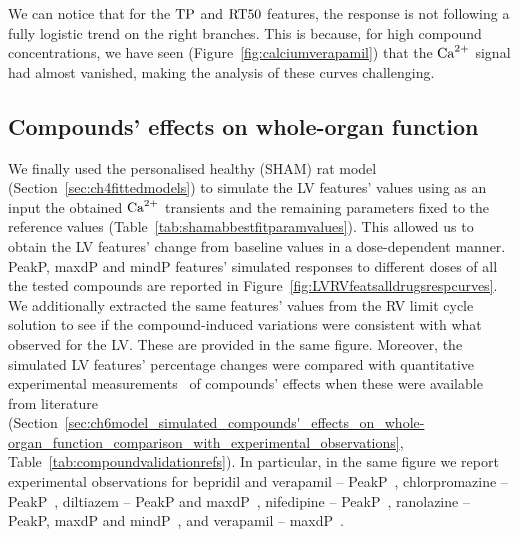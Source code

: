 \vspace{0.2cm}\noindent
We can notice that for the $\textrm{TP}$ and $\textrm{RT50}$ features, the response is not following a fully logistic trend on the right branches. This is because, for high compound concentrations, we have seen (Figure~\ref{fig:calciumverapamil}) that the $\textrm{Ca}^{2+}$ signal had almost vanished, making the analysis of these curves challenging.


%
%
%
\subsection{Compounds' effects on whole-organ function}\label{sec:ch6compounds_effects_on_the_whole_organ_function}
We finally used the personalised healthy (SHAM) rat model (Section~\ref{sec:ch4fittedmodels}) to simulate the LV features' values using as an input the obtained $\textrm{Ca}^{2+}$ transients and the remaining parameters fixed to the reference values (Table~\ref{tab:shamabbestfitparamvalues}). This allowed us to obtain the LV features' change from baseline values in a dose-dependent manner. PeakP, maxdP and mindP features' simulated responses to different doses of all the tested compounds are reported in Figure~\ref{fig:LVRVfeatsalldrugsrespcurves}. We additionally extracted the same features' values from the RV limit cycle solution to see if the compound-induced variations were consistent with what observed for the LV. These are provided in the same figure. Moreover, the simulated LV features' percentage changes were compared with quantitative experimental measurements~\cite{Amsterdam:1988,Langslet:1971,Koltai:1989,Saponara:2007,Wang:2007,Kolar:1990} of compounds' effects when these were available from literature (Section~\ref{sec:ch6model_simulated_compounds'_effects_on_whole-organ_function_comparison_with_experimental_observations}, Table~\ref{tab:compoundvalidationrefs}). In particular, in the same figure we report experimental observations for bepridil and verapamil -- PeakP~\cite{Amsterdam:1988}, chlorpromazine -- PeakP~\cite{Langslet:1971}, diltiazem -- PeakP and maxdP~\cite{Koltai:1989}, nifedipine -- PeakP~\cite{Saponara:2007}, ranolazine -- PeakP, maxdP and mindP~\cite{Wang:2007}, and verapamil -- maxdP~\cite{Kolar:1990}.

